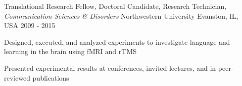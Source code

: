 \begin{cventries}
 \cventry
    {Translational Research Fellow, Doctoral Candidate, Research Technician, \textit{Communication Sciences \& Disorders}} %
    {Northwestern University} %
    {Evanston, IL, USA} %
    {2009 - 2015} %
   {
    \begin{cvitems}
    \item {Designed, executed, and analyzed experiments to investigate language and learning in the brain using fMRI and rTMS}
    \item {Presented experimental results at conferences, invited lectures, and in peer-reviewed publications} 
    \end{cvitems}
    }
    
\end{cventries}
